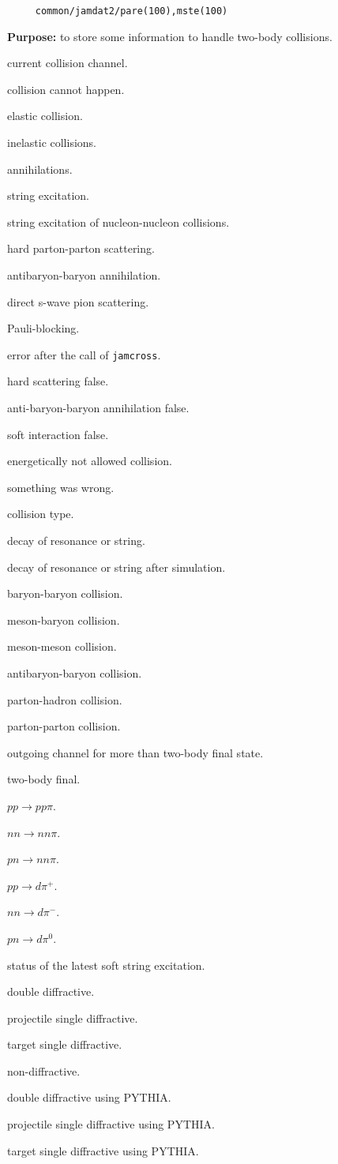 \documentclass[]{article}
\newenvironment{entry}%
{\begin{list}{}{\setlength{\topsep}{0mm} \setlength{\itemsep}{0mm}
\setlength{\parskip}{0mm} \setlength{\parsep}{0mm}
\setlength{\leftmargin}{20mm} \setlength{\rightmargin}{0mm}
\setlength{\labelwidth}{18mm} \setlength{\labelsep}{2mm}}}%
{\end{list}}
\newenvironment{subentry}%
{\begin{list}{}{\setlength{\topsep}{0mm} \setlength{\itemsep}{0mm}
\setlength{\parskip}{0mm} \setlength{\parsep}{0mm}
\setlength{\leftmargin}{10mm} \setlength{\rightmargin}{0mm}
\setlength{\labelwidth}{18mm} \setlength{\labelsep}{2mm}}}%
{\end{list}}
\newcommand{\ttt}[1]{{\tt#1}}
\newcommand{\itemt}[1]{\item[{\tt #1}\hfill]}
\begin{document}
\begin{verbatim}
     common/jamdat2/pare(100),mste(100)
\end{verbatim}
{\bf Purpose:} to store some information to handle two-body collisions.
\begin{entry}

\itemt{mste(1) :} current collision channel.
 \begin{subentry}
    \itemt{$=0$ :} collision cannot happen.
    \itemt{$=1$ :} elastic collision.
    \itemt{$=2$ :} inelastic collisions.
    \itemt{$=3$ :} annihilations.
    \itemt{$=4$ :} string excitation.
    \itemt{$=5$ :} string excitation of nucleon-nucleon collisions.
    \itemt{$=6$ :} hard parton-parton scattering.
    \itemt{$=7$ :} antibaryon-baryon annihilation.
   \itemt{$=11$ :}  direct s-wave pion scattering.
   \itemt{$= -1$ :} Pauli-blocking.
   \itemt{$= -2$ :} error after the call of \ttt{jamcross}.
   \itemt{$=-9$ :}  hard scattering false.
   \itemt{$=-66$ :} anti-baryon-baryon annihilation false.
   \itemt{$=-77$ :} soft interaction false.
   \itemt{$=-88$ :} energetically not allowed  collision.
   \itemt{$=-99$ :} something was wrong.
 \end{subentry}

\itemt{mste(2) :} collision type.
 \begin{subentry}
         \itemt{$=-1$ :} decay of resonance or string.
         \itemt{$=-2$ :} decay of resonance or string after simulation.
         \itemt{$=1$  :} baryon-baryon collision.
         \itemt{$=2$  :} meson-baryon collision.
         \itemt{$=3$  :} meson-meson collision.
         \itemt{$=4$  :} antibaryon-baryon collision.
         \itemt{$=5$  :} parton-hadron collision.
         \itemt{$=6$  :} parton-parton collision.
 \end{subentry}
\itemt{mste(3) :} outgoing channel for more than two-body final state.
 \begin{subentry}
         \itemt{$=0$ :} two-body final.
         \itemt{$=1$ :} $pp\to pp \pi$.
         \itemt{$=2$ :} $nn\to nn \pi$.
         \itemt{$=3$ :} $pn\to nn \pi$.
         \itemt{$=11$ :} $pp\to d \pi^+$.
         \itemt{$=12$ :} $nn\to d \pi^-$.
         \itemt{$=13$ :} $pn\to d \pi^0$.
 \end{subentry}
\itemt{mste(4) :} status of the latest soft string excitation.
 \begin{subentry}
        \itemt{$=1$ :} double diffractive.
	\itemt{$=2$ :} projectile single diffractive.
	\itemt{$=3$ :} target single diffractive.
	\itemt{$=4$ :} non-diffractive.
        \itemt{$=11$ :} double diffractive using PYTHIA.
	\itemt{$=12$ :} projectile single diffractive using PYTHIA.
	\itemt{$=13$ :} target single diffractive using PYTHIA.
 \end{subentry}


\end{entry}
\end{document}
